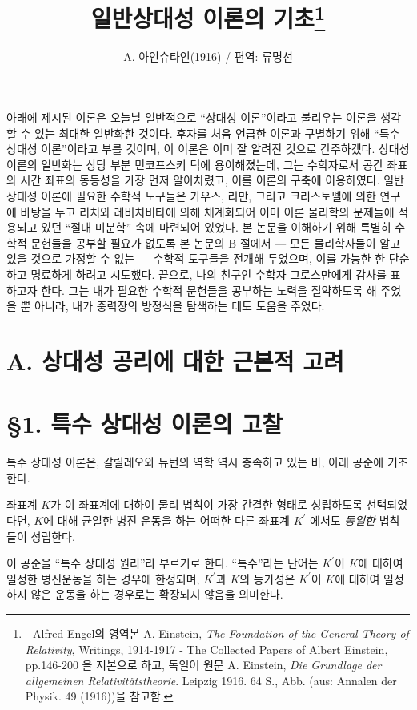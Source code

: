 \documentclass[b5paper]{article}
\title{일반상대성 이론의 기초\footnote{- Alfred Engel의 영역본 A. Einstein, \emph{The Foundation of the General Theory of Relativity}, Writings, 1914-1917 - The Collected Papers of Albert Einstein, pp.146-200 을 저본으로 하고, 독일어 원문 A. Einstein, \emph{Die Grundlage der allgemeinen Relativitätstheorie}. Leipzig 1916. 64 S., Abb. (aus: Annalen der Physik. 49 (1916))을 참고함.}}
\date{}
\author{\normalsize A. 아인슈타인(1916) / 편역: 류명선}
\begin{document}
\newcommand{\pderiv}[2]{{\frac{{\partial}{#1}}{{\partial}{#2}}}}
\newcommand{\ppderiv}[3]{{\frac{{\partial^2}{#1}}{{\partial}{#2}{\partial}{#3}}}}
\newcommand{\ilpderiv}[2]{{{{\partial}{#1}}/{{\partial}{#2}}}}
\newcommand{\ilppderiv}[3]{{\frac{{\partial^2}{#1}}/{{\partial}{#2}{\partial}{#3}}}}
\newcommand{\pppderiv}[4]{{\frac{{\partial^3}{#1}}{{\partial}{#2}{\partial}{#3}{\partial}{#4}}}}

\maketitle

아래에 제시된 이론은 오늘날 일반적으로 ``상대성 이론''이라고 불리우는 이론을 생각할 수 있는 최대한 일반화한 것이다. 후자를 처음 언급한 이론과 구별하기 위해 ``특수 상대성 이론''이라고 부를 것이며, 이 이론은 이미 잘 알려진 것으로 간주하겠다. 상대성 이론의 일반화는 상당 부분 민코프스키 덕에 용이해졌는데, 그는 수학자로서 공간 좌표와 시간 좌표의 동등성을 가장 먼저 알아차렸고, 이를 이론의 구축에 이용하였다. 
일반 상대성 이론에 필요한 수학적 도구들은 가우스, 리만, 그리고 크리스토펠에 의한 연구에 바탕을 두고 리치와 레비치비타에 의해 체계화되어 이미 이론 물리학의 문제들에 적용되고 있던 ``절대 미분학'' 속에 마련되어 있었다. 본 논문을 이해하기 위해 특별히 수학적 문헌들을 공부할 필요가 없도록 본 논문의 B 절에서 --- 모든 물리학자들이 알고 있을 것으로 가정할 수 없는 --- 수학적 도구들을 전개해 두었으며, 이를 가능한 한 단순하고 명료하게 하려고 시도했다. 
끝으로, 나의 친구인 수학자 그로스만에게 감사를 표하고자 한다. 그는 내가 필요한 수학적 문헌들을 공부하는 노력을 절약하도록 해 주었을 뿐 아니라, 내가 중력장의 방정식을 탐색하는 데도 도움을 주었다.

\section*{A. 상대성 공리에 대한 근본적 고려}
\section*{\S 1. 특수 상대성 이론의 고찰}
특수 상대성 이론은, 갈릴레오와 뉴턴의 역학 역시 충족하고 있는 바, 아래 공준에 기초한다.

좌표계 $K$가 이 좌표계에 대하여 물리 법칙이 가장 간결한 형태로 성립하도록 선택되었다면, $K$에 대해 균일한 병진 운동을 하는 어떠한 다른 좌표계 $K^\prime$ 에서도 \emph{동일한} 법칙들이 성립한다.
 
이 공준을 ``특수 상대성 원리''라 부르기로 한다. ``특수''라는 단어는 $K^{\prime}$이 $K$에 대하여  일정한 병진운동을 하는 경우에 한정되며, $K^{\prime}$과 $K$의 등가성은 $K^{\prime}$이 $K$에 대하여 일정하지 않은 운동을 하는 경우로는 확장되지 않음을 의미한다. 
\end{document}
